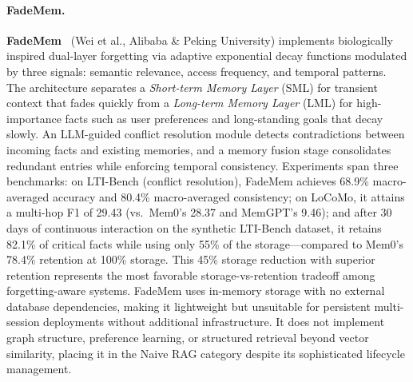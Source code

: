 \paragraph{FadeMem.}
\textbf{FadeMem}~\cite{fademem2026} (Wei et al., Alibaba \& Peking
University) implements biologically inspired dual-layer forgetting via
adaptive exponential decay functions modulated by three signals: semantic
relevance, access frequency, and temporal patterns.  The architecture
separates a \emph{Short-term Memory Layer} (SML) for transient context
that fades quickly from a \emph{Long-term Memory Layer} (LML) for
high-importance facts such as user preferences and long-standing goals
that decay slowly.  An LLM-guided conflict resolution module detects
contradictions between incoming facts and existing memories, and a memory
fusion stage consolidates redundant entries while enforcing temporal
consistency.  Experiments span three benchmarks: on LTI-Bench (conflict
resolution), FadeMem achieves 68.9\% macro-averaged accuracy and 80.4\%
macro-averaged consistency; on LoCoMo, it attains a multi-hop F1 of
29.43 (vs.\ Mem0's 28.37 and MemGPT's 9.46); and after 30 days of
continuous interaction on the synthetic LTI-Bench dataset, it retains
82.1\% of critical facts while using only 55\% of the storage---compared
to Mem0's 78.4\% retention at 100\% storage.  This 45\% storage reduction
with superior retention represents the most favorable
storage-vs-retention tradeoff among forgetting-aware systems.  FadeMem
uses in-memory storage with no external database dependencies, making it
lightweight but unsuitable for persistent multi-session deployments
without additional infrastructure.  It does not implement graph
structure, preference learning, or structured retrieval beyond vector
similarity, placing it in the Naive RAG category despite its
sophisticated lifecycle management.

